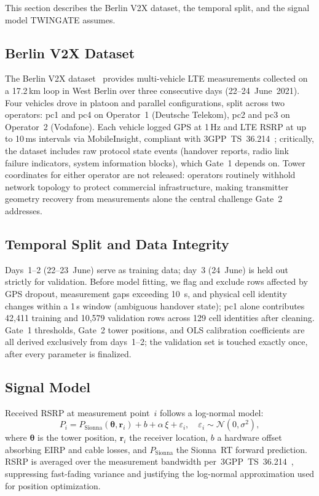 \documentclass[conference]{IEEEtran}
\begin{document}
This section describes the Berlin V2X dataset, the temporal split, and
the signal model TWINGATE assumes.

\subsection{Berlin V2X Dataset}

The Berlin V2X dataset~\cite{schiegg2022berlin} provides
multi-vehicle LTE measurements collected on a 17.2\,km loop
in West Berlin over three consecutive days (22--24~June~2021).
Four vehicles drove in platoon and parallel configurations, split
across two operators: pc1 and pc4 on Operator~1 (Deutsche Telekom), pc2
and pc3 on Operator~2 (Vodafone).
Each vehicle logged GPS at 1\,Hz and LTE RSRP at up to 10\,ms intervals
via MobileInsight, compliant with 3GPP~TS~36.214~\cite{3gpp36214};
critically, the dataset includes raw protocol state events (handover
reports, radio link failure indicators, system information blocks),
which Gate~1 depends on.
Tower coordinates for either operator are not released: operators
routinely withhold network topology to protect commercial
infrastructure, making transmitter geometry recovery from measurements
alone the central challenge Gate~2 addresses.

\subsection{Temporal Split and Data Integrity}

Days~1--2 (22--23~June) serve as training data; day~3 (24~June) is held
out strictly for validation. Before model fitting, we flag and exclude
rows affected by GPS dropout, measurement gaps exceeding 10~s, and
physical cell identity changes within a 1\,s window (ambiguous handover
state); pc1 alone contributes 42,411 training and 10,579 validation
rows across 129 cell identities after cleaning.
Gate~1 thresholds, Gate~2 tower positions, and OLS calibration
coefficients are all derived exclusively from days~1--2; the validation
set is touched exactly once, after every parameter is finalized.

\subsection{Signal Model}

Received RSRP at measurement point~$i$ follows a log-normal model:
\begin{equation}
  P_i = P_\text{Sionna}(\boldsymbol{\theta}, \mathbf{r}_i)
        + b + \alpha\,\xi + \varepsilon_i,
  \quad \varepsilon_i \sim \mathcal{N}(0, \sigma^2),
  \label{eq:signal}
\end{equation}
where $\boldsymbol{\theta}$ is the tower position, $\mathbf{r}_i$ the
receiver location, $b$ a hardware offset absorbing EIRP and cable
losses, and $P_\text{Sionna}$ the Sionna~RT forward prediction.
RSRP is averaged over the measurement bandwidth
per~3GPP~TS~36.214~\cite{3gpp36214}, suppressing fast-fading variance
and justifying the log-normal approximation used for position
optimization.
\end{document}
